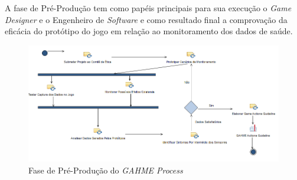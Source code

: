 A fase de Pré-Produção tem como papéis principais para sua execução o \textit{Game Designer} e o Engenheiro de \textit{Software} e como resultado final a comprovação da eficácia do protótipo do jogo em relação ao monitoramento dos dados de saúde. 
\begin{figure}[!HTB]
 \centering
 \includegraphics[scale=0.6]{./img/gahme-fase-pre-producao.png}
\caption{Fase de Pré-Produção do \textit{GAHME Process}}
 \label{fig:fasedesenvolvimento}
\end{figure}
\FloatBarrier









%

